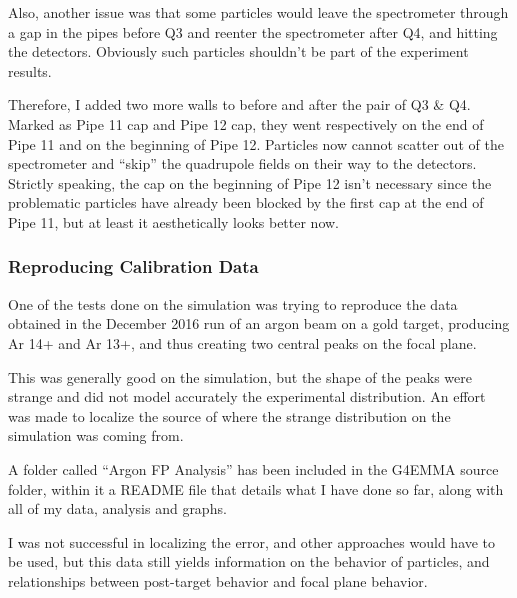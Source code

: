 \documentclass{article}
\begin{document}
Also, another issue was that some particles would leave the spectrometer through a gap in the pipes before Q3 and reenter the spectrometer after Q4, and hitting the detectors. Obviously such particles shouldn't be part of the experiment results. 

Therefore, I added two more walls to before and after the pair of Q3 \& Q4. Marked as Pipe 11 cap and Pipe 12 cap, they went respectively on the end of Pipe 11 and on the beginning of Pipe 12. Particles now cannot scatter out of the spectrometer and ``skip'' the quadrupole fields on their way to the detectors. Strictly speaking, the cap on the beginning of Pipe 12 isn't necessary since the problematic particles have already been blocked by the first cap at the end of Pipe 11, but at least it aesthetically looks better now. 

\subsubsection{Reproducing Calibration Data}

One of the tests done on the simulation was trying to reproduce the data obtained in the December 2016 run of an argon beam on a gold target, producing Ar 14+ and Ar 13+, and thus creating two central peaks on the focal plane. 

This was generally good on the simulation, but the shape of the peaks were strange and did not model accurately the experimental distribution. An effort was made to localize the source of where the strange distribution on the simulation was coming from. 

A folder called ``Argon FP Analysis'' has been included in the G4EMMA source folder, within it a README file that details what I have done so far, along with all of my data, analysis and graphs. 

I was not successful in localizing the error, and other approaches would have to be used, but this data still yields information on the behavior of particles, and relationships between post-target behavior and focal plane behavior. 





\end{document}
